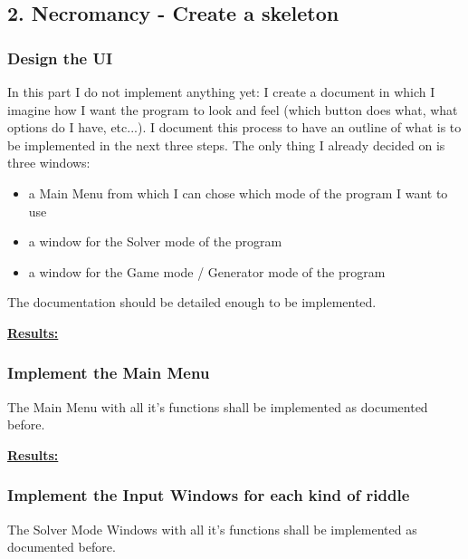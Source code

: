 \documentclass{article}
\begin{document}
	\newpage
	
	\subsection*{2. Necromancy - Create a skeleton}
	
	\subsubsection*{Design the UI}
	
	In this part I do not implement anything yet: I create a document in which I imagine how I want the program to look and feel (which button does what, what options do I have, etc...). I document this process to have an outline of what is to be implemented in the next three steps. The only thing I already decided on is three windows:
	\begin{itemize}
		\item a Main Menu from which I can chose which mode of the program I want to use
		\item a window for the Solver mode of the program
		\item a window for the Game mode / Generator mode of the program 
	\end{itemize}

	The documentation should be detailed enough to be implemented.
	
	\begin{framed}
		\textbf{\underline{Results:}}\\
	\end{framed}

	\subsubsection*{Implement the Main Menu}
	
	The Main Menu with all it's functions shall be implemented as documented before.
	
	\begin{framed}
		\textbf{\underline{Results:}}\\
	\end{framed}

	\subsubsection*{Implement the Input Windows for each kind of riddle}
	
	The Solver Mode Windows with all it's functions shall be implemented as documented before.
	
\end{document}
